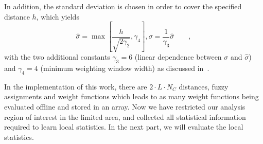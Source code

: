 \documentclass[conference]{IEEEtran}
\begin{document}

In addition, the standard
deviation is chosen in order to cover the specified distance $h$,
which yields 
\begin{equation}
  \label{eq:deviation}
  \hat{\sigma} = \max \left[\frac{h}{\sqrt{2\gamma_2}}, \gamma_4
  \right], \sigma  = \frac{1}{\gamma_3} \hat{\sigma}\qquad,
\end{equation}
with the two additional constants $\gamma_3 = 6$ (linear dependence
between $\sigma$ and $\hat{\sigma}$) and $\gamma_4 = 4$ (minimum
weighting window width) as discussed in~\cite{panin2006efficient}. 

In the implementation of this work,
there are $2 \cdot L \cdot N_C$ distances, fuzzy assignments
and weight functions which leads to as many weight functions being evaluated offline and stored in an array. Now we have restricted our analysis region of interest in the
limited area, and collected all statistical information required to learn
local statistics. In the next part, we will evaluate the local
statistics.
\end{document}
